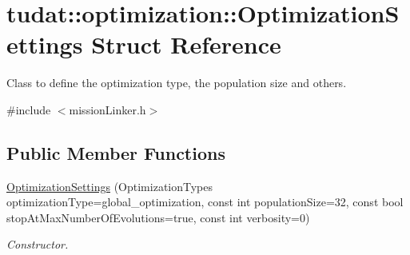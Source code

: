 \hypertarget{structtudat_1_1optimization_1_1OptimizationSettings}{}\section{tudat\+:\+:optimization\+:\+:Optimization\+Settings Struct Reference}
\label{structtudat_1_1optimization_1_1OptimizationSettings}


Class to define the optimization type, the population size and others.  




{\ttfamily \#include $<$mission\+Linker.\+h$>$}

\subsection*{Public Member Functions}
\begin{DoxyCompactItemize}
\item 
\hyperlink{structtudat_1_1optimization_1_1OptimizationSettings_a4e66da6c1c4ba28dd02d7e3e1d7802b1}{Optimization\+Settings} (Optimization\+Types optimization\+Type=global\+\_\+optimization, const int population\+Size=32, const bool stop\+At\+Max\+Number\+Of\+Evolutions=true, const int verbosity=0)
\begin{DoxyCompactList}\small\item\em Constructor. \end{DoxyCompactList}\end{DoxyCompactItemize}
